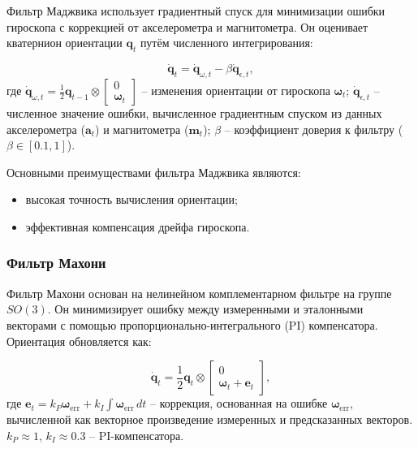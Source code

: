 {Фильтр Маджвика использует градиентный спуск для минимизации ошибки гироскопа 
с коррекцией от акселерометра и магнитометра. Он оценивает кватернион ориентации
\(\mathbf{q}_t\) путём численного интегрирования:

\begin{equation}
    \dot{\mathbf{q}}_t = \dot{\mathbf{q}}_{\omega, t} - \beta \dot{\mathbf{q}}_{\epsilon, t},
\end{equation}
где
    \(\dot{\mathbf{q}}_{\omega, t} = \frac{1}{2} \mathbf{q}_{t-1} \otimes \begin{bmatrix} 0 \\ 
    \boldsymbol{\omega}_t \end{bmatrix}\) -- изменения ориентации от гироскопа \(\boldsymbol{\omega}_t\);
    \(\dot{\mathbf{q}}_{\epsilon, t}\) -- 
    численное значение ошибки, вычисленное градиентным спуском из данных акселерометра 
    (\(\mathbf{a}_t\)) и магнитометра (\(\mathbf{m}_t\));
    \(\beta\) -- коэффициент доверия к фильтру ($\beta \in [0.1, 1]$).

Основными преимуществами фильтра Маджвика являются:
\begin{itemize}
	\item высокая точность вычисления ориентации;
	\item эффективная компенсация дрейфа гироскопа.
\end{itemize}

\subsubsection{Фильтр Махони}

Фильтр Махони основан на нелинейном комплементарном фильтре на группе \(SO(3)\).
Он минимизирует ошибку между измеренными и эталонными векторами с помощью пропорционально-интегрального (PI)
компенсатора. Ориентация обновляется как:

\begin{equation}
    \dot{\mathbf{q}}_t = \frac{1}{2} \mathbf{q}_t \otimes \begin{bmatrix} 0 \\ \boldsymbol{\omega}_t + \mathbf{e}_t \end{bmatrix},
\end{equation}
где
    \(\mathbf{e}_t = k_P \boldsymbol{\omega}_{\text{err}} + k_I \int \boldsymbol{\omega}_{\text{err}} \, dt\) --
    коррекция, основанная на ошибке \(\boldsymbol{\omega}_{\text{err}}\), 
    вычисленной как векторное произведение измеренных и предсказанных векторов.
    \(k_P \approx 1\), \(k_I \approx 0.3\) -- PI-компенсатора.

}
